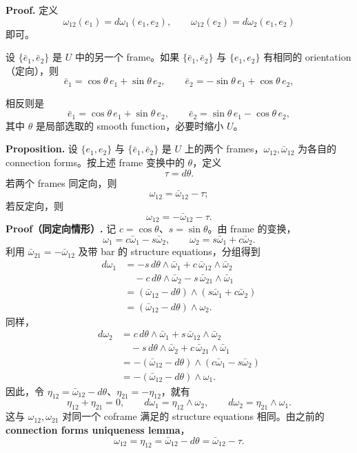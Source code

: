 \documentclass[UTF8,11pt,a4paper]{ctexart}
\begin{document}
\textbf{Proof.} 定义
\[
\omega_{12}(e_1)=d\omega_1(e_1,e_2),
\qquad
\omega_{12}(e_2)=d\omega_2(e_1,e_2)
\]
即可。

设 $\{\bar e_1,\bar e_2\}$ 是 $U$ 中的另一个 frame。如果 $\{\bar e_1,\bar e_2\}$ 与 $\{e_1,e_2\}$ 有相同的 orientation（定向），则
\[
\bar e_1=\cos\theta\,e_1+\sin\theta\,e_2,
\qquad
\bar e_2=-\sin\theta\,e_1+\cos\theta\,e_2,
\]


相反则是
\[
\bar e_1=\cos\theta\,e_1+\sin\theta\,e_2,
\qquad
\bar e_2=\sin\theta\,e_1-\cos\theta\,e_2,
\]
其中 $\theta$ 是局部选取的 smooth function，必要时缩小 $U$。

\textbf{Proposition.} 设 $\{e_1,e_2\}$ 与 $\{\bar e_1,\bar e_2\}$ 是 $U$ 上的两个 frames，$\omega_{12},\bar\omega_{12}$ 为各自的 connection forms。按上述 frame 变换中的 $\theta$，定义
\[
\tau=d\theta.
\]
若两个 frames 同定向，则
\[
\omega_{12}=\bar\omega_{12}-\tau;
\]
若反定向，则
\[
\omega_{12}=-\bar\omega_{12}-\tau.
\]
\textbf{Proof（同定向情形）.} 记 $c=\cos\theta$、$s=\sin\theta$。由 frame 的变换，
\[
\omega_1=c\bar\omega_1-s\bar\omega_2,
\qquad
\omega_2=s\bar\omega_1+c\bar\omega_2.
\]
利用 $\bar\omega_{21}=-\bar\omega_{12}$ 及带 bar 的 structure equations，分组得到
\begin{align*}
d\omega_1
&=-s\,d\theta\wedge\bar\omega_1
+c\,\bar\omega_{12}\wedge\bar\omega_2\\
&\quad-c\,d\theta\wedge\bar\omega_2
-s\,\bar\omega_{21}\wedge\bar\omega_1\\
&=(\bar\omega_{12}-d\theta)
\wedge(s\bar\omega_1+c\bar\omega_2)\\
&=(\bar\omega_{12}-d\theta)\wedge\omega_2.
\end{align*}
同样，
\begin{align*}
d\omega_2
&=c\,d\theta\wedge\bar\omega_1
+s\,\bar\omega_{12}\wedge\bar\omega_2\\
&\quad-s\,d\theta\wedge\bar\omega_2
+c\,\bar\omega_{21}\wedge\bar\omega_1\\
&=-(\bar\omega_{12}-d\theta)
\wedge(c\bar\omega_1-s\bar\omega_2)\\
&=-(\bar\omega_{12}-d\theta)\wedge\omega_1.
\end{align*}
因此，令 $\eta_{12}=\bar\omega_{12}-d\theta$、$\eta_{21}=-\eta_{12}$，就有
\[
\eta_{12}+\eta_{21}=0,
\qquad
d\omega_1=\eta_{12}\wedge\omega_2,
\qquad
d\omega_2=\eta_{21}\wedge\omega_1.
\]
这与 $\omega_{12},\omega_{21}$ 对同一个 coframe 满足的 structure equations 相同。由之前的 \textbf{connection forms uniqueness lemma}，
\[
\omega_{12}=\eta_{12}=\bar\omega_{12}-d\theta
=\bar\omega_{12}-\tau.
\]
\end{document}
